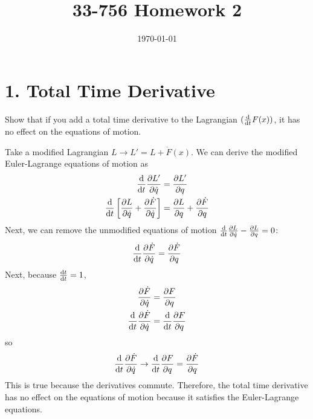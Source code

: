 \documentclass[a4paper,twoside]{article}
\title{33-756 Homework 2}
\date{\today}
\begin{document}
\maketitle

\section*{1. Total Time Derivative}
Show that if you add a total time derivative to the Lagrangian $ (\dv{t}F(x)) $, it has no effect on the equations of motion.
\begin{problem}
    Take a modified Lagrangian $ L \to L' = L + \dot{F}(x) $. We can derive the modified Euler-Lagrange equations of motion as
    \begin{align}
        \dv{t} \pdv{L'}{\dot{q}} &= \pdv{L'}{q} \\
        \dv{t} \left[\pdv{L}{\dot{q}} + \pdv{\dot{F}}{\dot{q}}\right] &= \pdv{L}{q} + \pdv{\dot{F}}{q} \\
    \end{align}
    Next, we can remove the unmodified equations of motion $ \dv{t} \pdv{L}{\dot{q}} - \pdv{L}{q} = 0 $:
    \begin{equation}
        \dv{t} \pdv{\dot{F}}{\dot{q}} = \pdv{\dot{F}}{q}
    \end{equation}
    Next, because $ \dv{t}{t} = 1 $,
    \begin{align}
        \pdv{\dot{F}}{\dot{q}} &= \pdv{F}{q} \\
        \dv{t} \pdv{\dot{F}}{\dot{q}} &= \dv{t} \pdv{F}{q} \\
    \end{align}
    so
    \begin{equation}
        \dv{t} \pdv{\dot{F}}{\dot{q}} \to \dv{t} \pdv{F}{q} = \pdv{\dot{F}}{q}
    \end{equation}
    This is true because the derivatives commute. Therefore, the total time derivative has no effect on the equations of motion because it satisfies the Euler-Lagrange equations.
\end{problem}
\end{document}
